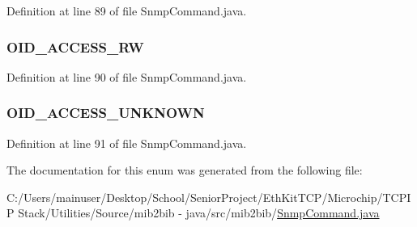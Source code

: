 Definition at line 89 of file Snmp\+Command.\+java.

\hypertarget{enummib2bib_1_1_snmp_command_1_1_o_i_d___a_c_c_e_s_s_a05dfc94220fa1fbd32b5fe1d0bdefa2b}{}
\subsubsection[{O\+I\+D\+\_\+\+A\+C\+C\+E\+S\+S\+\_\+\+R\+W}]{\setlength{\rightskip}{0pt plus 5cm}O\+I\+D\+\_\+\+A\+C\+C\+E\+S\+S\+\_\+\+R\+W}\label{enummib2bib_1_1_snmp_command_1_1_o_i_d___a_c_c_e_s_s_a05dfc94220fa1fbd32b5fe1d0bdefa2b}


Definition at line 90 of file Snmp\+Command.\+java.

\hypertarget{enummib2bib_1_1_snmp_command_1_1_o_i_d___a_c_c_e_s_s_aee9678b6556f58c7a98d0a343b1e93e7}{}
\subsubsection[{O\+I\+D\+\_\+\+A\+C\+C\+E\+S\+S\+\_\+\+U\+N\+K\+N\+O\+W\+N}]{\setlength{\rightskip}{0pt plus 5cm}O\+I\+D\+\_\+\+A\+C\+C\+E\+S\+S\+\_\+\+U\+N\+K\+N\+O\+W\+N}\label{enummib2bib_1_1_snmp_command_1_1_o_i_d___a_c_c_e_s_s_aee9678b6556f58c7a98d0a343b1e93e7}


Definition at line 91 of file Snmp\+Command.\+java.



The documentation for this enum was generated from the following file\+:\begin{DoxyCompactItemize}
\item 
C\+:/\+Users/mainuser/\+Desktop/\+School/\+Senior\+Project/\+Eth\+Kit\+T\+C\+P/\+Microchip/\+T\+C\+P\+I\+P Stack/\+Utilities/\+Source/mib2bib -\/ java/src/mib2bib/\hyperlink{_snmp_command_8java}{Snmp\+Command.\+java}\end{DoxyCompactItemize}
